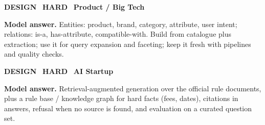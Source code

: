 \begin{tcolorbox}[enhanced,breakable,colback=white,colframe=crimson,arc=2mm,boxrule=0.8pt,left=3mm,right=3mm,
 title={\textbf{QIII.10}\quad Design a knowledge graph to power product search for an e-commerce site.},fonttitle=\color{white}\small,colbacktitle=crimson]
\colorbox{crimson!15}{\scriptsize\bfseries\color{crimson} DESIGN}\
\colorbox{crimson!15}{\scriptsize\bfseries\color{crimson} HARD}\
\colorbox{navy!8}{\scriptsize\bfseries\color{navy} Product / Big Tech}\par\smallskip
\textbf{\color{navy}Model answer.} Entities: product, brand, category, attribute, user intent; relations: is-a, has-attribute, compatible-with. Build from catalogue plus extraction; use it for query expansion and faceting; keep it fresh with pipelines and quality checks.
\end{tcolorbox}
\begin{tcolorbox}[enhanced,breakable,colback=white,colframe=crimson,arc=2mm,boxrule=0.8pt,left=3mm,right=3mm,
 title={\textbf{QIII.11}\quad How would you reduce hallucinations in an LLM chatbot for university regulations?},fonttitle=\color{white}\small,colbacktitle=crimson]
\colorbox{crimson!15}{\scriptsize\bfseries\color{crimson} DESIGN}\
\colorbox{crimson!15}{\scriptsize\bfseries\color{crimson} HARD}\
\colorbox{navy!8}{\scriptsize\bfseries\color{navy} AI Startup}\par\smallskip
\textbf{\color{navy}Model answer.} Retrieval-augmented generation over the official rule documents, plus a rule base / knowledge graph for hard facts (fees, dates), citations in answers, refusal when no source is found, and evaluation on a curated question set.
\end{tcolorbox}